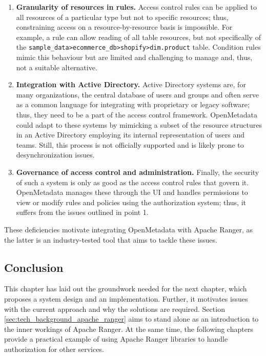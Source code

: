 \begin{enumerate}

    \item \textbf{Granularity of resources in rules.} Access control rules can be applied to all resources of a particular type but not to specific resources; thus, constraining access on a resource-by-resource basis is impossible. For example, a rule can allow reading of all table resources, but not specifically of the \texttt{sample_data>ecommerce_db>shopify>dim.product} table. Condition rules mimic this behaviour but are limited and challenging to manage and, thus, not a suitable alternative.

    \item \textbf{Integration with Active Directory.} Active Directory systems are, for many organizations, the central database of users and groups and often serve as a common language for integrating with proprietary or legacy software; thus, they need to be a part of the access control framework. OpenMetadata could adapt to these systems by mimicking a subset of the resource structures in an Active Directory employing its internal representation of users and teams. Still, this process is not officially supported and is likely prone to desynchronization issues.

    \item \textbf{Governance of access control and administration.} Finally, the security of such a system is only as good as the access control rules that govern it. OpenMetadata manages these through the UI and handles permissions to view or modify rules and policies using the authorization system; thus, it suffers from the issues outlined in point 1.

\end{enumerate}

These deficiencies motivate integrating OpenMetadata with Apache Ranger, as the latter is an industry-tested tool that aims to tackle these issues.

\subsection{Conclusion}

This chapter has laid out the groundwork needed for the next chapter, which proposes a system design and an implementation. Further, it motivates issues with the current approach and why the solutions are required. Section \ref{sec:tech_background_apache_ranger} aims to stand alone as an introduction to the inner workings of Apache Ranger. At the same time, the following chapters provide a practical example of using Apache Ranger libraries to handle authorization for other services.
